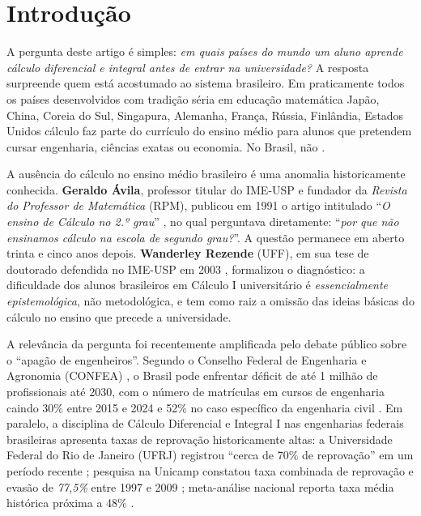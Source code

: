 \documentclass[12pt,a4paper,oneside]{article}
\begin{document}
\section{Introdução}

A pergunta deste artigo é simples: \emph{em quais países do
mundo um aluno aprende cálculo diferencial e integral antes de entrar
na universidade?} A resposta surpreende quem está acostumado ao
sistema brasileiro. Em praticamente todos os países desenvolvidos com
tradição séria em educação matemática \cite{ref:jasso-eju,ref:moe-h2math,ref:nrw-mathematik,ref:eduscol-spe-maths,ref:csat-wiki,ref:opetus-finland,ref:tomcircle-gaokao,ref:ap-calculus,ref:ege-wiki}
\textemdash{} Japão, China, Coreia do Sul, Singapura, Alemanha,
França, Rússia, Finlândia, Estados Unidos \textemdash{} cálculo
faz parte do currículo do ensino médio para alunos que pretendem
cursar engenharia, ciências exatas ou economia. No Brasil, não
\cite{ref:bncc-2018,ref:sbem-calculo}.

A ausência do cálculo no ensino médio brasileiro é uma anomalia
historicamente conhecida. \textbf{Geraldo Ávila}, professor titular
do IME-USP e fundador da \emph{Revista do Professor de Matemática}
(RPM), publicou em 1991 o artigo intitulado ``\emph{O ensino de
Cálculo no 2.º grau}'' \cite{ref:avila-rpm18}, no qual perguntava
diretamente: ``\emph{por que não ensinamos cálculo na escola de
segundo grau?}''. A questão permanece em aberto trinta e cinco anos
depois. \textbf{Wanderley Rezende} (UFF), em sua tese de doutorado
defendida no IME-USP em 2003 \cite{ref:rezende-calculo}, formalizou
o diagnóstico: a dificuldade dos alunos brasileiros em Cálculo I
universitário é \emph{essencialmente epistemológica}, não
metodológica, e tem como raiz a omissão das ideias básicas do
cálculo no ensino que precede a universidade.

A relevância da pergunta foi recentemente amplificada pelo debate
público sobre o ``apagão de engenheiros''. Segundo o Conselho
Federal de Engenharia e Agronomia (CONFEA) \cite{ref:confea-deficit},
o Brasil pode enfrentar déficit de até 1 milhão de profissionais
até 2030, com o número de matrículas em cursos de engenharia caindo
30\% entre 2015 e 2024 e 52\% no caso específico da engenharia
civil \cite{ref:otempo-deficit,ref:senge-rj}. Em paralelo, a
disciplina de Cálculo Diferencial e Integral I nas engenharias
federais brasileiras apresenta taxas de reprovação historicamente
altas: a Universidade Federal do Rio de Janeiro (UFRJ) registrou
``cerca de 70\% de reprovação'' em um período recente
\cite{ref:caeng-ufrj}; pesquisa na Unicamp constatou taxa combinada
de reprovação e evasão de \emph{77,5\%} entre 1997 e 2009
\cite{ref:unicamp-calculo}; meta-análise nacional reporta taxa
média histórica próxima a 48\% \cite{ref:abenge-reprovacao}.
\end{document}
